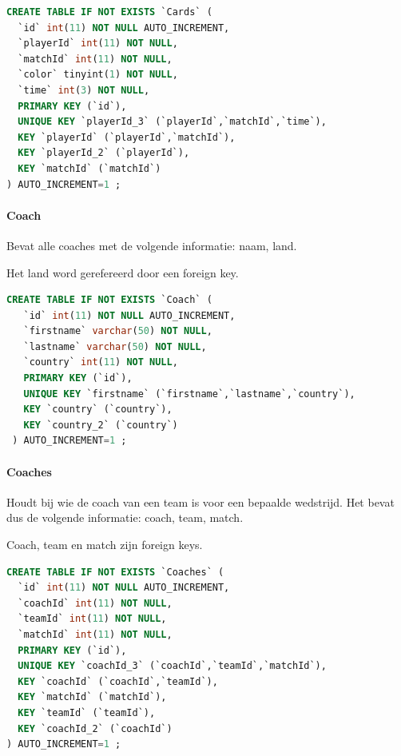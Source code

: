 \documentclass[11pt]{article}
\begin{document}
        \begin{framed}
        \begin{lstlisting}[language=sql]
CREATE TABLE IF NOT EXISTS `Cards` (
  `id` int(11) NOT NULL AUTO_INCREMENT,
  `playerId` int(11) NOT NULL,
  `matchId` int(11) NOT NULL,
  `color` tinyint(1) NOT NULL,
  `time` int(3) NOT NULL,
  PRIMARY KEY (`id`),
  UNIQUE KEY `playerId_3` (`playerId`,`matchId`,`time`),
  KEY `playerId` (`playerId`,`matchId`),
  KEY `playerId_2` (`playerId`),
  KEY `matchId` (`matchId`)
) AUTO_INCREMENT=1 ;
        \end{lstlisting}
        \end{framed}
    
    
    \paragraph{Coach}
        Bevat alle coaches met de volgende informatie:
            naam, land.
            
            
        Het land word gerefereerd door een foreign key.
        
        \begin{framed}
        \begin{lstlisting}[language=sql]
 CREATE TABLE IF NOT EXISTS `Coach` (
   `id` int(11) NOT NULL AUTO_INCREMENT,
   `firstname` varchar(50) NOT NULL,
   `lastname` varchar(50) NOT NULL,
   `country` int(11) NOT NULL,
   PRIMARY KEY (`id`),
   UNIQUE KEY `firstname` (`firstname`,`lastname`,`country`),
   KEY `country` (`country`),
   KEY `country_2` (`country`)
 ) AUTO_INCREMENT=1 ;
        \end{lstlisting}
        \end{framed}
        
        
        
    \paragraph{Coaches}
        Houdt bij wie de coach van een team is voor een bepaalde wedstrijd. Het bevat dus de volgende informatie:
            coach, team, match.
            
        Coach, team en match zijn foreign keys.
        
        \begin{framed}
        \begin{lstlisting}[language=sql]
CREATE TABLE IF NOT EXISTS `Coaches` (
  `id` int(11) NOT NULL AUTO_INCREMENT,
  `coachId` int(11) NOT NULL,
  `teamId` int(11) NOT NULL,
  `matchId` int(11) NOT NULL,
  PRIMARY KEY (`id`),
  UNIQUE KEY `coachId_3` (`coachId`,`teamId`,`matchId`),
  KEY `coachId` (`coachId`,`teamId`),
  KEY `matchId` (`matchId`),
  KEY `teamId` (`teamId`),
  KEY `coachId_2` (`coachId`)
) AUTO_INCREMENT=1 ;
        \end{lstlisting}
        \end{framed}
        
\end{document}
